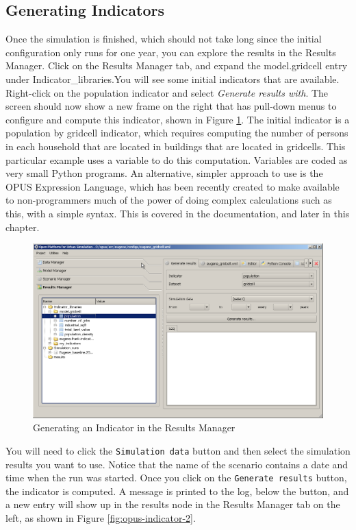 \subsection{Generating Indicators}
Once the simulation is finished, which should not take long since the initial configuration only runs for one year, you can explore the results in the Results Manager.  Click on the Results Manager tab, and expand the model.gridcell entry under Indicator\_libraries.You will see some initial indicators that are available.  Right-click on the population indicator and select \emph{Generate results with}.  The screen should now show a new frame on the right that has pull-down menus to configure and compute this indicator, shown in Figure \ref{fig:opus-generate-indicator}.  The initial indicator is a population by gridcell indicator, which requires computing the number of persons in each household that are located in buildings that are located in gridcells.  This particular example uses a variable to do this computation.  Variables are coded as very small Python programs.  An alternative, simpler approach to use is the OPUS Expression Language, which has been recently created to make available to non-programmers much of the power of doing complex calculations such as this, with a simple syntax.  This is covered in the documentation, and later in this chapter. 

\begin{figure}[htp]
\begin{center}
\includegraphics[scale=0.4]{graphics/opus-generate-indicator.png}
\end{center}
\caption{Generating an Indicator in the Results Manager}
\label{fig:opus-generate-indicator}
\end{figure}

You will need to click the \verb#Simulation data# button and then select the simulation results you want to use.  Notice that the name of the scenario contains a date and time when the run was started.  Once you click on the \verb#Generate results# button, the indicator is computed.  A message is printed to the log, below the button, and a new entry will show up in the results node in the Results Manager tab on the left, as shown in Figure \ref{fig:opus-indicator-2}.

